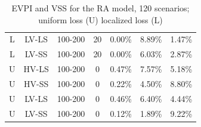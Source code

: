 \documentclass[,9pt,xcolor={dvipsnames}]{beamer} %
\begin{document}
\begin{frame}
{\begin{table}[h!]
\begin{tabular}{c c c c c j f}
				L & LV-LS & 100-200 & 20 & 0.00\% & 8.89\% & 1.47\% \\
				L & LV-SS & 100-200 & 20 & 0.00\% & 6.03\% & 2.87\% \\
				\hline
				U & HV-LS & 100-200 & 0 & 0.47\% & 7.57\% & 5.18\% \\
				U & HV-SS & 100-200 & 0 & 0.22\% & 4.50\% & 8.80\% \\
				U & LV-LS & 100-200 & 0 & 0.46\% & 6.40\% & 4.44\% \\
				U & LV-SS & 100-200 & 0 & 0.12\% & 1.89\% & 9.22\% \\
				\hline
			\end{tabular}
			\caption{EVPI and VSS for the RA model, 120 scenarios; uniform loss (U) localized loss (L)}
			\label{tab:optres3}
		\end{table}
	}
\end{frame}
\end{document}
